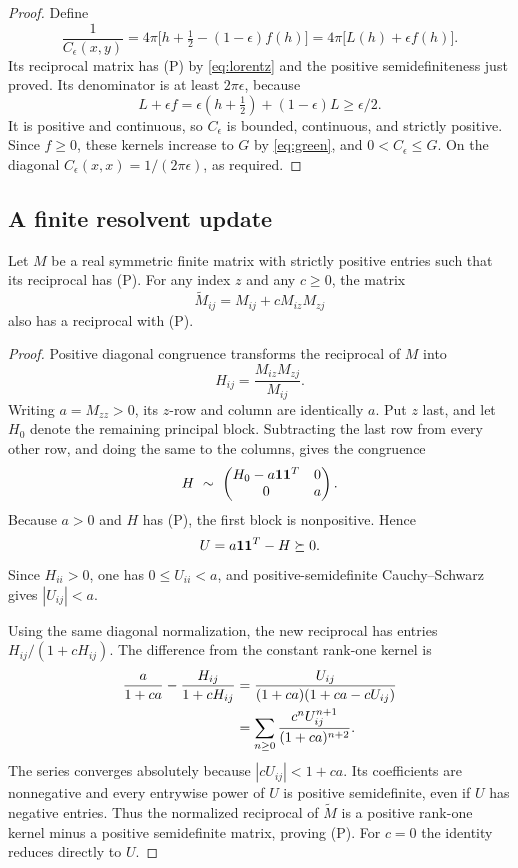 \begin{proof}
Define
\begin{equation}\label{eq:C-epsilon}
\frac1{C_\epsilon(x,y)}
=4\pi\bigl[h+\tfrac12-(1-\epsilon)f(h)\bigr]
=4\pi\bigl[L(h)+\epsilon f(h)\bigr].
\end{equation}
Its reciprocal matrix has \textup{(P)} by \eqref{eq:lorentz} and the positive semidefiniteness just proved. Its denominator is at least $2\pi\epsilon$, because
\[
L+\epsilon f=\epsilon(h+\tfrac12)+(1-\epsilon)L\ge\epsilon/2.
\]
It is positive and continuous, so $C_\epsilon$ is bounded, continuous, and strictly positive. Since $f\ge0$, these kernels increase to $G$ by \eqref{eq:green}, and $0<C_\epsilon\le G$. On the diagonal $C_\epsilon(x,x)=1/(2\pi\epsilon)$, as required.
\end{proof}

\subsection{A finite resolvent update}

\begin{lemma}\label{lem:update}
Let $M$ be a real symmetric finite matrix with strictly positive entries such that its reciprocal has \textup{(P)}. For any index $z$ and any $c\ge0$, the matrix
\[
\widetilde M_{ij}=M_{ij}+cM_{iz}M_{zj}
\]
also has a reciprocal with \textup{(P)}.
\end{lemma}
\begin{proof}
Positive diagonal congruence transforms the reciprocal of $M$ into
\[
H_{ij}=\frac{M_{iz}M_{zj}}{M_{ij}}.
\]
Writing $a=M_{zz}>0$, its $z$-row and column are identically $a$. Put $z$ last, and let $H_0$ denote the remaining principal block. Subtracting the last row from every other row, and doing the same to the columns, gives the congruence
\[
H\ \sim\
\begin{pmatrix}H_0-a\mathbf 1\mathbf 1^T&0\\0&a\end{pmatrix}.
\]
Because $a>0$ and $H$ has \textup{(P)}, the first block is nonpositive. Hence
\[
U=a\mathbf 1\mathbf 1^T-H\succeq0.
\]
Since $H_{ii}>0$, one has $0\le U_{ii}<a$, and positive-semidefinite Cauchy--Schwarz gives $|U_{ij}|<a$.

Using the same diagonal normalization, the new reciprocal has entries $H_{ij}/(1+cH_{ij})$. The difference from the constant rank-one kernel is
\begin{align}
\frac a{1+ca}-\frac{H_{ij}}{1+cH_{ij}}
&=\frac{U_{ij}}{(1+ca)(1+ca-cU_{ij})}\notag\\
&=\sum_{n\ge0}\frac{c^nU_{ij}^{n+1}}{(1+ca)^{n+2}}.\label{eq:update-series}
\end{align}
The series converges absolutely because $|cU_{ij}|<1+ca$. Its coefficients are nonnegative and every entrywise power of $U$ is positive semidefinite, even if $U$ has negative entries. Thus the normalized reciprocal of $\widetilde M$ is a positive rank-one kernel minus a positive semidefinite matrix, proving \textup{(P)}. For $c=0$ the identity reduces directly to $U$.
\end{proof}

